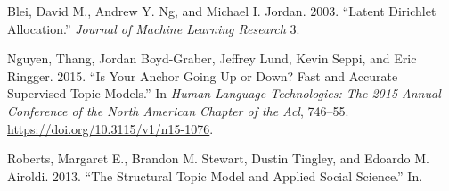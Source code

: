 \documentclass[conference,final,]{IEEEtran}
\begin{document}
\leavevmode\hypertarget{ref-blei2002lda}{}%
Blei, David M., Andrew Y. Ng, and Michael I. Jordan. 2003. ``Latent
Dirichlet Allocation.'' \emph{Journal of Machine Learning Research} 3.

\leavevmode\hypertarget{ref-nguyen2015supervisedtm}{}%
Nguyen, Thang, Jordan Boyd-Graber, Jeffrey Lund, Kevin Seppi, and Eric
Ringger. 2015. ``Is Your Anchor Going Up or Down? Fast and Accurate
Supervised Topic Models.'' In \emph{Human Language Technologies: The
2015 Annual Conference of the North American Chapter of the Acl},
746--55. \url{https://doi.org/10.3115/v1/n15-1076}.

\leavevmode\hypertarget{ref-roberts2013stm}{}%
Roberts, Margaret E., Brandon M. Stewart, Dustin Tingley, and Edoardo M.
Airoldi. 2013. ``The Structural Topic Model and Applied Social
Science.'' In.
\end{document}
